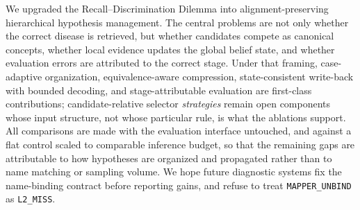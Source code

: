 We upgraded the Recall--Discrimination Dilemma into alignment-preserving hierarchical hypothesis management.
The central problems are not only whether the correct disease is retrieved, but whether candidates compete as canonical concepts, whether local evidence updates the global belief state, and whether evaluation errors are attributed to the correct stage.
Under that framing, case-adaptive organization, equivalence-aware compression, state-consistent write-back with bounded decoding, and stage-attributable evaluation are first-class contributions; candidate-relative selector \emph{strategies} remain open components whose input structure, not whose particular rule, is what the ablations support.
All comparisons are made with the evaluation interface untouched, and against a flat control scaled to comparable inference budget, so that the remaining gaps are attributable to how hypotheses are organized and propagated rather than to name matching or sampling volume.
We hope future diagnostic systems fix the name-binding contract before reporting gains, and refuse to treat \texttt{MAPPER\_UNBIND} as \texttt{L2\_MISS}.
